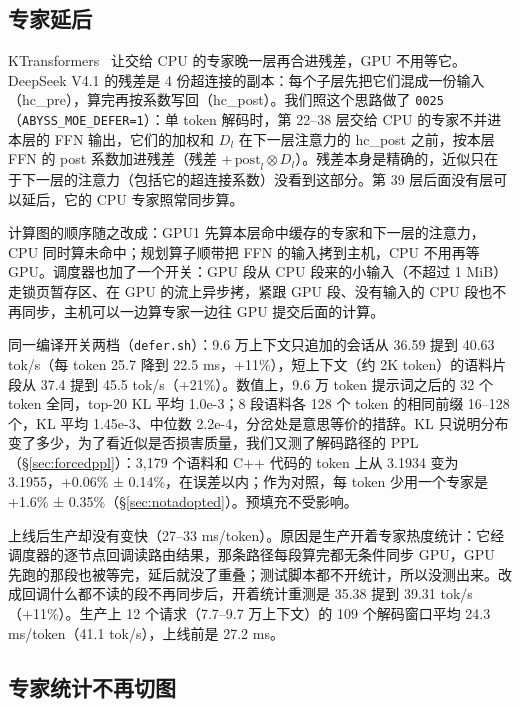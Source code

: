 \documentclass[11pt,a4paper]{article}
\newcommand{\code}[1]{\texttt{#1}}
\newcommand{\tps}{tok/s}
\begin{document}
\subsection{专家延后}
\label{sec:defer}

KTransformers~\cite{ktrans} 让交给 CPU 的专家晚一层再合进残差，GPU 不用等它。DeepSeek V4.1 的残差是 4 份超连接的副本：每个子层先把它们混成一份输入（hc\_pre），算完再按系数写回（hc\_post）。我们照这个思路做了 \code{0025}（\code{ABYSS\_MOE\_DEFER=1}）：单 token 解码时，第 22--38 层交给 CPU 的专家不并进本层的 FFN 输出，它们的加权和 $D_l$ 在下一层注意力的 hc\_post 之前，按本层 FFN 的 post 系数加进残差（残差 $+\,\mathrm{post}_l \otimes D_l$）。残差本身是精确的，近似只在于下一层的注意力（包括它的超连接系数）没看到这部分。第 39 层后面没有层可以延后，它的 CPU 专家照常同步算。

计算图的顺序随之改成：GPU1 先算本层命中缓存的专家和下一层的注意力，CPU 同时算未命中；规划算子顺带把 FFN 的输入拷到主机，CPU 不用再等 GPU。调度器也加了一个开关：GPU 段从 CPU 段来的小输入（不超过 1 MiB）走锁页暂存区、在 GPU 的流上异步拷，紧跟 GPU 段、没有输入的 CPU 段也不再同步，主机可以一边算专家一边往 GPU 提交后面的计算。

同一编译开关两档（\code{defer.sh}）：9.6 万上下文只追加的会话从 36.59 提到 40.63 \tps{}（每 token 25.7 降到 22.5 ms，+11\%），短上下文（约 2K token）的语料片段从 37.4 提到 45.5 \tps{}（+21\%）。数值上，9.6 万 token 提示词之后的 32 个 token 全同，top-20 KL 平均 1.0e-3；8 段语料各 128 个 token 的相同前缀 16--128 个，KL 平均 1.45e-3、中位数 2.2e-4，分岔处是意思等价的措辞。KL 只说明分布变了多少，为了看近似是否损害质量，我们又测了解码路径的 PPL（\S\ref{sec:forcedppl}）：3,179 个语料和 C++ 代码的 token 上从 3.1934 变为 3.1955，+0.06\% ± 0.14\%，在误差以内；作为对照，每 token 少用一个专家是 +1.6\% ± 0.35\%（\S\ref{sec:notadopted}）。预填充不受影响。

上线后生产却没有变快（27--33 ms/token）。原因是生产开着专家热度统计：它经调度器的逐节点回调读路由结果，那条路径每段算完都无条件同步 GPU，GPU 先跑的那段也被等完，延后就没了重叠；测试脚本都不开统计，所以没测出来。改成回调什么都不读的段不再同步后，开着统计重测是 35.38 提到 39.31 \tps{}（+11\%）。生产上 12 个请求（7.7--9.7 万上下文）的 109 个解码窗口平均 24.3 ms/token（41.1 \tps{}），上线前是 27.2 ms。

\subsection{专家统计不再切图}
\label{sec:stats}
\end{document}
